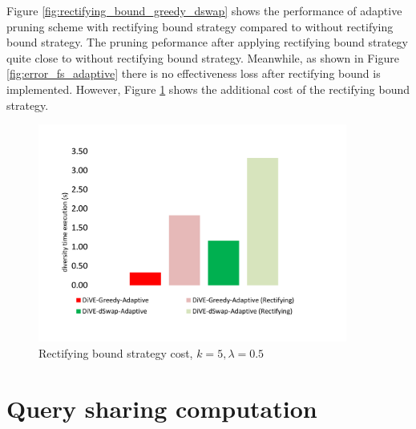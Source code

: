\documentclass{article}
\begin{document}
Figure \ref{fig:rectifying_bound_greedy_dswap} shows the performance of adaptive pruning scheme with rectifying bound strategy compared to without rectifying bound strategy. The pruning peformance after applying rectifying bound strategy quite close to without rectifying bound strategy. Meanwhile, as shown in Figure \ref{fig:error_fs_adaptive} there is no effectiveness loss after rectifying bound is implemented. However, Figure \ref{fig:rectifying_cost} shows the additional cost of the rectifying bound strategy. 




\begin{figure}
	\begin{center}
		\includegraphics[width=4.0in]{figures/rectifying_cost}
		\vspace{-8pt}
		\caption{Rectifying bound strategy cost, $k = 5, \lambda = 0.5$}
		\label{fig:rectifying_cost}
		
	\end{center}
\end{figure}



%		

\section{Query sharing computation}
\end{document}
